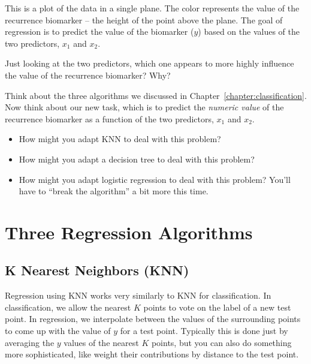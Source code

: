 This is a plot of the data in a single plane. The color represents the value of the recurrence biomarker -- the height of the point above the plane. The goal of regression is to predict the value of the biomarker ($y$) based on the values of the two predictors, $x_1$ and $x_2$.
\vspace{5mm} 

\begin{question}{}
Just looking at the two predictors, which one appears to more highly influence the value of the recurrence biomarker? Why?
\end{question}
\vspace{2mm}

\begin{question}{}
Think about the three algorithms we discussed in Chapter~\ref{chapter:classification}. Now think about our new task, which is to predict the \emph{numeric value} of the recurrence biomarker as a function of the two predictors, $x_1$ and $x_2$. 
\begin{itemize}
\item How might you adapt KNN to deal with this problem?
\item How might you adapt a decision tree to deal with this problem?
\item How might you adapt logistic regression to deal with this problem? You'll have to ``break the algorithm'' a bit more this time.  
\end{itemize}
\end{question}


\section{Three Regression Algorithms}

\subsection{K Nearest Neighbors (KNN)}

Regression using KNN works very similarly to KNN for classification. In classification, we allow the nearest $K$ points to vote on the label of a new test point. In regression, we interpolate between the values of the surrounding points to come up with the value of $y$ for a test point. Typically this is done just by averaging the $y$ values of the nearest $K$ points, but you can also do something more sophisticated, like weight their contributions by distance to the test point. 

